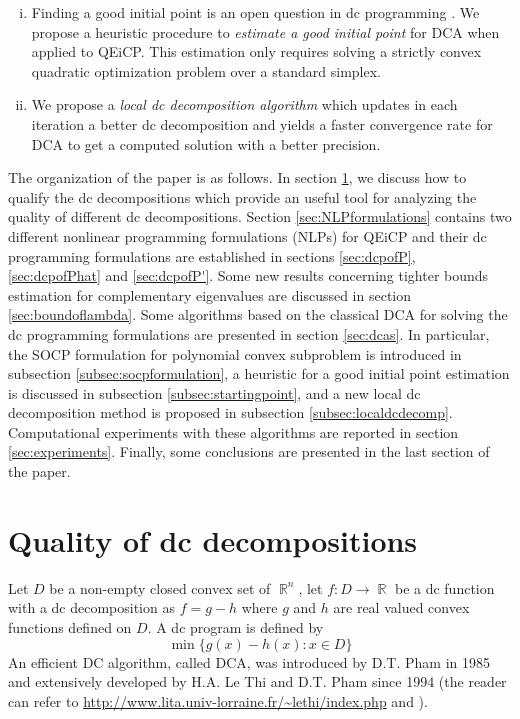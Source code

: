 \documentclass[3p]{elsarticle}
\DeclareMathOperator{\R}{\mathbb{R}}
\begin{document}
\begin{enumerate}[(i)]
	\item Finding a good initial point is an open question in dc programming \cite{Pham18}. We propose a heuristic procedure to \emph{estimate a good initial point} for DCA when applied to QEiCP. This estimation only requires solving a strictly convex quadratic optimization problem over a standard simplex.
	\item We propose a \emph{local dc decomposition algorithm} which updates in each iteration a better dc decomposition and yields a faster convergence rate for DCA to get a computed solution with a better precision.
\end{enumerate}

The organization of the paper is as follows. In section \ref{sec:betterdcdecomp}, we discuss how to qualify the dc decompositions which provide an useful tool for analyzing the quality of different dc decompositions. Section \ref{sec:NLPformulations} contains two different nonlinear programming formulations (NLPs) for QEiCP and their dc programming formulations are established in sections \ref{sec:dcpofP}, \ref{sec:dcpofPhat} and \ref{sec:dcpofP'}. Some new results concerning tighter bounds estimation for complementary eigenvalues are discussed in section \ref{sec:boundoflambda}. Some algorithms based on the classical DCA for solving the dc programming formulations are presented in section \ref{sec:dcas}. In particular, the SOCP formulation for polynomial convex subproblem is introduced in subsection \ref{subsec:socpformulation}, a heuristic for a good initial point estimation is discussed in subsection \ref{subsec:startingpoint}, and a new local dc decomposition method is proposed in subsection \ref{subsec:localdcdecomp}. Computational experiments with these algorithms are reported in section \ref{sec:experiments}. Finally, some conclusions are presented in the last section of the paper.

\section{Quality of dc decompositions}\label{sec:betterdcdecomp}
Let $D$ be a non-empty closed convex set of $\R^n$, let $f:D \to \R$ be a dc function with a dc decomposition as $f=g-h$ where $g$ and $h$ are real valued convex functions defined on $D$. A dc program is defined by \begin{equation}
\min\{g(x)-h(x):x\in D\}
\end{equation}
An efficient DC algorithm, called DCA, was introduced by D.T. Pham in 1985 and extensively developed by H.A. Le Thi and D.T. Pham since 1994 (the reader can refer to  \url{http://www.lita.univ-lorraine.fr/~lethi/index.php} and \cite{Pham98,Pham05,Pham18}). 
\end{document}
